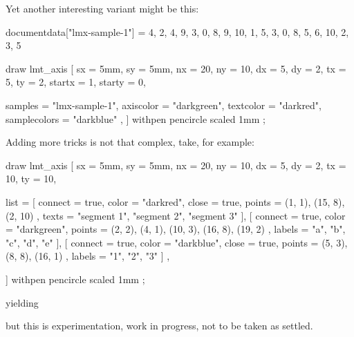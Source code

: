 \typebuffer[option=TEX]

\startlinecorrection
\getbuffer
\stoplinecorrection

Yet another interesting variant might be this:

\startbuffer
\startluacode
    documentdata["lmx-sample-1"] = {
        {
            4, 2, 4, 9, 3, 0, 8, 9, 10, 1,
            5, 3, 0, 8, 5, 6, 10, 2, 3, 5
        }
    }
\stopluacode
\stopbuffer

\typebuffer[option=TEX] \getbuffer

\startbuffer
{}
    draw lmt_axis [
        sx     = 5mm, sy     = 5mm,
        nx     = 20,  ny     = 10,
        dx     = 5,   dy     = 2,
        tx     = 5,   ty     = 2,
        startx = 1,   starty = 0,

        samples      = "lmx-sample-1",
        axiscolor    = "darkgreen",
        textcolor    = "darkred",
        samplecolors = { "darkblue" },
    ] withpen pencircle scaled 1mm ;
\stopMPcode
\stopbuffer

\typebuffer[option=TEX]

\startlinecorrection
\getbuffer
\stoplinecorrection


Adding more tricks is not that complex, take, for example:

\startbuffer
{}
draw lmt_axis [
    sx =  5mm, sy =  5mm,
    nx = 20,   ny = 10,
    dx =  5,   dy =  2,
    tx = 10,   ty = 10,

    list = {
        [
            connect = true,
            color   = "darkred",
            close   = true,
            points  = { (1, 1), (15, 8), (2, 10) },
            texts   = { "segment 1", "segment 2", "segment 3" }
        ],
        [
            connect = true,
            color   = "darkgreen",
            points  = { (2, 2), (4, 1), (10, 3), (16, 8), (19, 2) },
            labels  = { "a", "b", "c", "d", "e" }
        ],
        [
            connect = true,
            color   = "darkblue",
            close   = true,
            points  = { (5, 3), (8, 8), (16, 1) },
            labels  = { "1", "2", "3" }
        ]
    },

] withpen pencircle scaled 1mm  ;
\stopMPcode
\stopbuffer

\typebuffer[option=TEX]

yielding

\startlinecorrection
\getbuffer
\stoplinecorrection

but this is experimentation, work in progress, not to be taken as settled.

